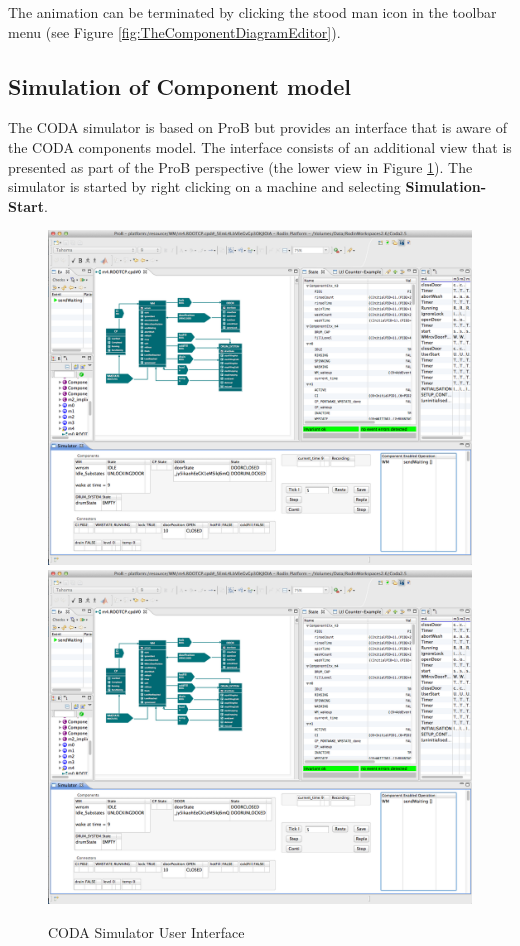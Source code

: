 The animation can be terminated by clicking the stood man icon in the toolbar menu (see Figure \ref{fig:TheComponentDiagramEditor}).


\subsection{Simulation of Component model}
The CODA simulator is based on ProB but provides an interface that is aware of the CODA components model. The interface consists of an additional view that is presented as part of the ProB perspective (the lower view in Figure \ref{fig:CODASimulatorUserInterface}). The simulator is started by right clicking on a machine and selecting \textbf{Simulation-Start}. 
 
 \begin{figure}[!htbp]
  \centering
  \ifplastex
  \includegraphics[width=1024]{figures/image11.png}
  \else
  \includegraphics[width=1\textwidth]{figures/image11.png}
  \fi
  \caption{CODA Simulator User Interface}
  \label{fig:CODASimulatorUserInterface}
\end{figure}


